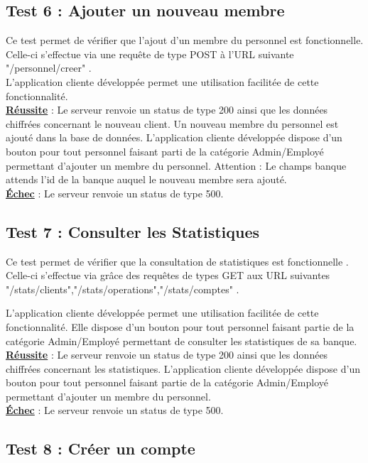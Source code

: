 \subsection{Test 6 : Ajouter un nouveau membre}

Ce test permet de vérifier que l'ajout d'un membre du personnel est fonctionnelle.
Celle-ci s'effectue via une requête de type POST à l'URL suivante "/personnel/creer" .
\\
L'application cliente développée permet une utilisation facilitée de cette fonctionnalité. 
\\
\textbf{\underline{Réussite}} : Le serveur renvoie un status de type 200 ainsi que les données chiffrées concernant le nouveau client. Un nouveau membre du personnel est ajouté dans la base de données.
L'application cliente développée dispose d'un bouton pour tout personnel faisant parti de la catégorie Admin/Employé permettant d'ajouter un membre du personnel.
Attention : Le champs banque attends l'id de la banque auquel le nouveau membre sera ajouté.
\\
\textbf{\underline{Échec}} : Le serveur renvoie un status de type 500.

\subsection{Test 7 : Consulter les Statistiques}
Ce test permet de vérifier que la consultation de statistiques est fonctionnelle .
Celle-ci s'effectue via grâce des requêtes de types GET aux URL suivantes "/stats/clients","/stats/operations","/stats/comptes" .

L'application cliente développée permet une utilisation facilitée de cette fonctionnalité. 
Elle dispose d'un bouton pour tout personnel faisant partie de la catégorie Admin/Employé permettant de consulter les statistiques de sa banque.
\\
\textbf{\underline{Réussite}} : Le serveur renvoie un status de type 200 ainsi que les données chiffrées concernant les statistiques.
L'application cliente développée dispose d'un bouton pour tout personnel faisant partie de la catégorie Admin/Employé permettant d'ajouter un membre du personnel.
\\
\textbf{\underline{Échec}} : Le serveur renvoie un status de type 500.

\subsection{Test 8 : Créer un compte }

